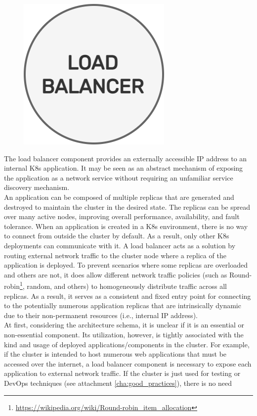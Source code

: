 \begin{figure}
  \centering
  \includegraphics[width=.2\textwidth]{images/architecture/load_balancer.png}
\end{figure}

The load balancer component provides an externally accessible IP address to an
internal K8s application. It may be seen as an abstract mechanism of exposing the
application as a network service without requiring an unfamiliar service discovery
mechanism\cite{load_balancer}. \\ %
An application can be composed of multiple replicas that are generated and
destroyed to maintain the cluster in the desired state. The replicas can be spread
over many active nodes, improving overall performance, availability, and fault
tolerance. When an application is created in a K8s environment, there is no way
to connect from outside the cluster by default. As a result, only other K8s
deployments can communicate with it. A load balancer acts as a solution by routing
external network traffic to the cluster node where a replica of the application is
deployed. To prevent scenarios where some replicas are overloaded and others are
not, it does allow different network traffic policies (such as Round-robin\footnote{\url{https://wikipedia.org/wiki/Round-robin_item_allocation}},
random, and others) to homogeneously distribute traffic across all replicas. As
a result, it serves as a consistent and fixed entry point for connecting to the potentially
numerous application replicas that are intrinsically dynamic due to their non-permanent
resources (i.e., internal IP address). \\ %
At first, considering the architecture schema, it is unclear if it is an essential
or non-essential component. Its utilization, however, is tightly associated with
the kind and usage of deployed applications/components in the cluster. For example,
if the cluster is intended to host numerous web applications that must be
accessed over the internet, a load balancer component is necessary to expose each
application to external network traffic. If the cluster is just used for testing
or DevOps techniques (see attachment \ref{cha:good_practices}), there is no need
